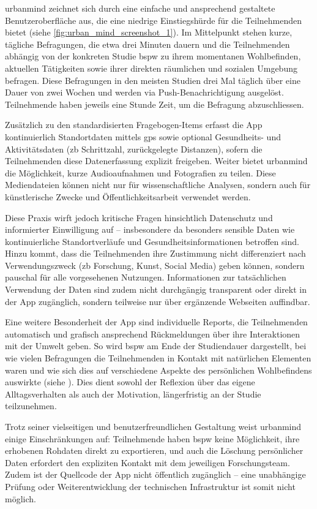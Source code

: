 \gls{urbanmind} zeichnet sich durch eine einfache und ansprechend gestaltete Benutzeroberfläche aus, die eine niedrige Einstiegshürde für die Teilnehmenden bietet (siehe \cref{fig:urban_mind_screenshot_1}). Im Mittelpunkt stehen kurze, tägliche Befragungen, die etwa drei Minuten dauern und die Teilnehmenden abhängig von der konkreten Studie \gls{bspw} zu ihrem momentanen Wohlbefinden, aktuellen Tätigkeiten sowie ihrer direkten räumlichen und sozialen Umgebung befragen. Diese Befragungen in den meisten Studien drei Mal täglich über eine Dauer von zwei Wochen und werden via Push-Benachrichtigung ausgelöst. Teilnehmende haben jeweils eine Stunde Zeit, um die Befragung abzuschliessen.

Zusätzlich zu den standardisierten Fragebogen-Items erfasst die App kontinuierlich Standortdaten mittels \gls{gps} sowie optional Gesundheits- und Aktivitätsdaten (\gls{zb} Schrittzahl, zurückgelegte Distanzen), sofern die Teilnehmenden diese Datenerfassung explizit freigeben. Weiter bietet \gls{urbanmind} die Möglichkeit, kurze Audioaufnahmen und Fotografien zu teilen. Diese Mediendateien können nicht nur für wissenschaftliche Analysen, sondern auch für künstlerische Zwecke und Öffentlichkeitsarbeit verwendet werden.

Diese Praxis wirft jedoch kritische Fragen hinsichtlich Datenschutz und informierter Einwilligung auf -- insbesondere da besonders sensible Daten wie kontinuierliche Standortverläufe und Gesundheitsinformationen betroffen sind. Hinzu kommt, dass die Teilnehmenden ihre Zustimmung nicht differenziert nach Verwendungszweck (\gls{zb} Forschung, Kunst, Social Media) geben können, sondern pauschal für alle vorgesehenen Nutzungen. Informationen zur tatsächlichen Verwendung der Daten sind zudem nicht durchgängig transparent oder direkt in der App zugänglich, sondern teilweise nur über ergänzende Webseiten auffindbar.

Eine weitere Besonderheit der App sind individuelle Reports, die Teilnehmenden automatisch und grafisch ansprechend Rückmeldungen über ihre Interaktionen mit der Umwelt geben. So wird \gls{bspw} am Ende der Studiendauer dargestellt, bei wie vielen Befragungen die Teilnehmenden in Kontakt mit natürlichen Elementen waren und wie sich dies auf verschiedene Aspekte des persönlichen Wohlbefindens auswirkte (siehe ). Dies dient sowohl der Reflexion über das eigene Alltagsverhalten als auch der Motivation, längerfristig an der Studie teilzunehmen.

Trotz seiner vielseitigen und benutzerfreundlichen Gestaltung weist \gls{urbanmind} einige Einschränkungen auf: Teilnehmende haben \gls{bspw} keine Möglichkeit, ihre erhobenen Rohdaten direkt zu exportieren, und auch die Löschung persönlicher Daten erfordert den expliziten Kontakt mit dem jeweiligen Forschungsteam. Zudem ist der Quellcode der App nicht öffentlich zugänglich -- eine unabhängige Prüfung oder Weiterentwicklung der technischen Infrastruktur ist somit nicht möglich.

